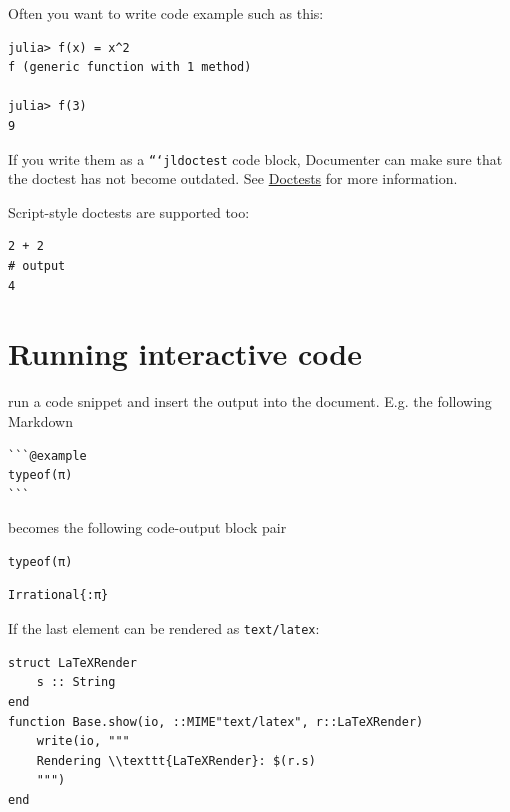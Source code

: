 Often you want to write code example such as this:




\begin{verbatim}
julia> f(x) = x^2
f (generic function with 1 method)

julia> f(3)
9
\end{verbatim}



If you write them as a \texttt{```jldoctest} code block, Documenter can make sure that the doctest has not become outdated. See \href{@ref}{Doctests} for more information.



Script-style doctests are supported too:




\begin{verbatim}
2 + 2
# output
4
\end{verbatim}



\section{Running interactive code}



\label{3545462789522369084}{}


 run a code snippet and insert the output into the document. E.g. the following Markdown




\begin{verbatim}
```@example
typeof(π)
```
\end{verbatim}



becomes the following code-output block pair




\begin{verbatim}
typeof(π)
\end{verbatim}


\begin{verbatim}
Irrational{:π}
\end{verbatim}



If the last element can be rendered as \texttt{text/latex}:




\begin{verbatim}
struct LaTeXRender
    s :: String
end
function Base.show(io, ::MIME"text/latex", r::LaTeXRender)
    write(io, """
    Rendering \\texttt{LaTeXRender}: $(r.s)
    """)
end
\end{verbatim}




